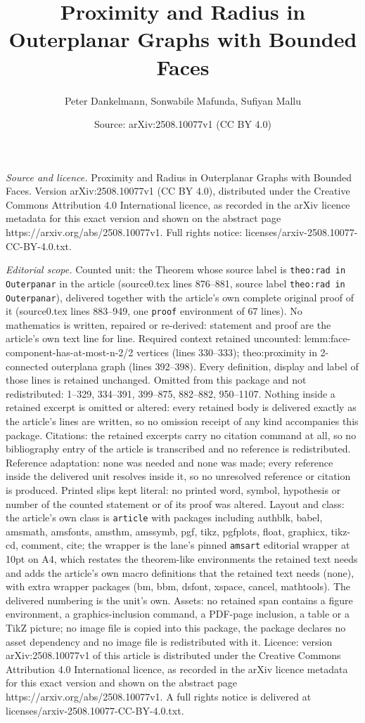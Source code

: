 \documentclass[10pt,a4paper]{amsart}
\title[Proximity and Radius in Outerplanar Graphs with Bounded Face]{Proximity and Radius in Outerplanar Graphs with Bounded Faces}
\author{Peter Dankelmann, Sonwabile Mafunda, Sufiyan Mallu}
\date{Source: arXiv:2508.10077v1 (CC BY 4.0)}
\begin{document}
\maketitle

\noindent\emph{Source and licence.} Proximity and Radius in Outerplanar Graphs with Bounded Faces. Version arXiv:2508.10077v1 (CC BY 4.0), distributed under the Creative Commons Attribution 4.0 International licence, as recorded in the arXiv licence metadata for this exact version and shown on the abstract page https://arxiv.org/abs/2508.10077v1. Full rights notice: licenses/arxiv-2508.10077-CC-BY-4.0.txt.\par\smallskip

\noindent\textit{Editorial scope.} Counted unit: the Theorem whose source label is \texttt{theo:rad in Outerpanar} in the article (source0.tex lines 876--881, source label \texttt{theo:rad in Outerpanar}), delivered together with the article's own complete original proof of it (source0.tex lines 883--949, one \texttt{proof} environment of 67 lines). No mathematics is written, repaired or re-derived: statement and proof are the article's own text line for line. Required context retained uncounted: lemm:face-component-has-at-most-n-2/2 vertices (lines 330--333); theo:proximity in 2-connected outerplana graph (lines 392--398). Every definition, display and label of those lines is retained unchanged. Omitted from this package and not redistributed: 1--329, 334--391, 399--875, 882--882, 950--1107. Nothing inside a retained excerpt is omitted or altered: every retained body is delivered exactly as the article's lines are written, so no omission receipt of any kind accompanies this package. Citations: the retained excerpts carry no citation command at all, so no bibliography entry of the article is transcribed and no reference is redistributed. Reference adaptation: none was needed and none was made; every reference inside the delivered unit resolves inside it, so no unresolved reference or citation is produced. Printed slips kept literal: no printed word, symbol, hypothesis or number of the counted statement or of its proof was altered. Layout and class: the article's own class is \texttt{article} with packages including authblk, babel, amsmath, amsfonts, amsthm, amssymb, pgf, tikz, pgfplots, float, graphicx, tikz-cd, comment, cite; the wrapper is the lane's pinned \texttt{amsart} editorial wrapper at 10pt on A4, which restates the theorem-like environments the retained text needs and adds the article's own macro definitions that the retained text needs (none), with extra wrapper packages (bm, bbm, dsfont, xspace, cancel, mathtools). The delivered numbering is the unit's own. Assets: no retained span contains a figure environment, a graphics-inclusion command, a PDF-page inclusion, a table or a TikZ picture; no image file is copied into this package, the package declares no asset dependency and no image file is redistributed with it. Licence: version arXiv:2508.10077v1 of this article is distributed under the Creative Commons Attribution 4.0 International licence, as recorded in the arXiv licence metadata for this exact version and shown on the abstract page https://arxiv.org/abs/2508.10077v1. A full rights notice is delivered at licenses/arxiv-2508.10077-CC-BY-4.0.txt. 
\end{document}
